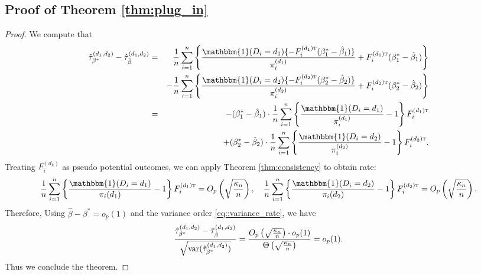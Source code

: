 \documentclass[twoside]{article}
\theoremstyle{plain}
\theoremstyle{definition}
\theoremstyle{remark}
\def\T{{\textsc{t}}}
\newcommand{\var}{\textup{var}}
\newcommand{\indicator}{\mathbbm{1}}
\newcommand{\sumi}{\sum_{i=1}^n}
\begin{document}
\subsection{Proof of Theorem \ref{thm:plug_in}}
\begin{proof}
    We compute that
    \begin{eqnarray*}
        \hat\tau^{(d_1, d_2)}_{\beta^*} - \hat\tau^{(d_1, d_2)}_{\hat\beta} &=& \frac{1}{n}\sumi \left\{ \frac{\indicator(D_i=d_1)\{-F_i^{(d_1)\T} (\beta_1^* - \hat\beta_1)\}}{\pi_i^{(d_1)}} + F_i^{(d_1)\T}(\beta_1^* - \hat\beta_1) \right\} \\
        &&- \frac{1}{n}\sumi \left\{ \frac{\indicator(D_i=d_2)\{-F_i^{(d_2)\T} (\beta_2^* - \hat\beta_2)\}}{\pi_i^{(d_2)}} + F_i^{(d_2)\T}(\beta_2^* - \hat\beta_2) \right\} \\
        &=& -(\beta_1^* - \hat\beta_1)\cdot \frac{1}{n}\sumi  \left\{\frac{\indicator(D_i=d_1)}{\pi_i^{(d_1)}} - 1\right\}F_i^{(d_1)\T} \\
        &&+ (\beta_2^* - \hat\beta_2)\cdot \frac{1}{n}\sumi \left\{\frac{\indicator(D_i=d_2)}{\pi_i^{(d_2)}} - 1\right\}F_i^{(d_2)\T}.
    \end{eqnarray*}
    Treating $F_i^{(d_k)}$ as pseudo potential outcomes, we can apply Theorem \ref{thm:consistency} to obtain rate:
    \begin{eqnarray*}
        \frac{1}{n}\sumi  \left\{\frac{\indicator(D_i=d_1)}{\pi_i(d_1)} - 1\right\}F_i^{(d_1)\T} = O_p\left(\sqrt{\frac{\kappa_n}{n}}\right), \quad \frac{1}{n}\sumi \left\{\frac{\indicator(D_i=d_2)}{\pi_i(d_2)} - 1\right\}F_i^{(d_2)\T} = O_p\left(\sqrt{\frac{\kappa_n}{n}}\right).
    \end{eqnarray*}
    Therefore,  Using $\hat\beta - \beta^* = o_p(1)$ and the variance order \eqref{eq::variance_rate}, we have
    \begin{eqnarray*}
        \frac{\hat\tau^{(d_1, d_2)}_{\beta^*} - \hat\tau^{(d_1, d_2)}_{\hat\beta}}{\sqrt{\var(\hat\tau^{(d_1, d_2)}_{\beta^*})}} = \frac{O_p\left(\sqrt{\frac{\kappa_n}{n}}\right) \cdot o_p(1)}{\Theta\left(\sqrt{\frac{\kappa_n}{n}}\right)}  = o_p(1).
    \end{eqnarray*}
    Thus we conclude the theorem.
\end{proof}
\end{document}

